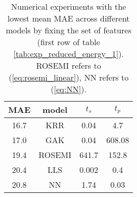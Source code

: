 \documentclass[12pt]{article}
\begin{document}
\begin{table}[H]
	\centering
	\caption{Numerical experiments with the lowest mean MAE across different models by fixing the set of features (first row of table \ref{tab:exp_reduced_energy_1}). ROSEMI refers to (\ref{eq:rosemi_linear}), NN refers to (\ref{eq:NN}).}
	\label{tab:exp_reduced_energy_2}
	\begin{tabular}{|c|c|c|c|}
		\hline
		\textbf{MAE} & \textbf{model} & \textbf{$t_s$} & \textbf{$t_p$} \\ \hline
		16.7         & KRR            & 0.04           & 4.7            \\ \hline
		17.0         & GAK            & 0.04           & 608.08         \\ \hline
		19.4         & ROSEMI         & 641.7          & 152.8          \\ \hline
		20.4         & LLS            & 0.002          & 0.4            \\ \hline
		20.8         & NN             & 1.74           & 0.03           \\ \hline
	\end{tabular}
\end{table}


\fi
\end{document}
